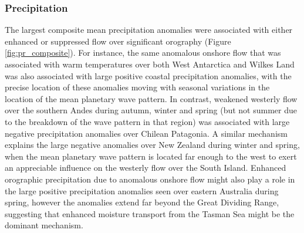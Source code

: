 \subsubsection{Precipitation}

The largest composite mean precipitation anomalies were associated with either enhanced or suppressed flow over significant orography (Figure \ref{fig:pr_composite}). For instance, the same anomalous onshore flow that was associated with warm temperatures over both West Antarctica and Wilkes Land was also associated with large positive coastal precipitation anomalies, with the precise location of these anomalies moving with seasonal variations in the location of the mean planetary wave pattern. In contrast, weakened westerly flow over the southern Andes during autumn, winter and spring (but not summer due to the breakdown of the wave pattern in that region) was associated with large negative precipitation anomalies over Chilean Patagonia. A similar mechanism explains the large negative anomalies over New Zealand during winter and spring, when the mean planetary wave pattern is located far enough to the west to exert an appreciable influence on the westerly flow over the South Island. Enhanced orographic precipitation due to anomalous onshore flow might also play a role in the large positive precipitation anomalies seen over eastern Australia during spring, however the anomalies extend far beyond the Great Dividing Range, suggesting that enhanced moisture transport from the Tasman Sea might be the dominant mechanism. 
